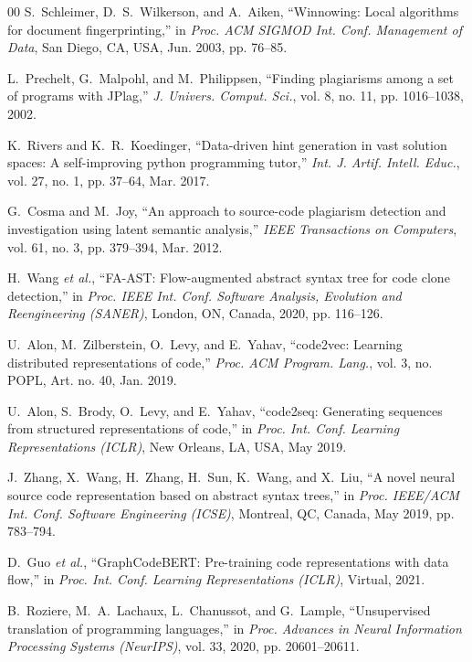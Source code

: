\begin{thebibliography}{00}
S.~Schleimer, D.~S.~Wilkerson, and A.~Aiken, ``Winnowing: Local algorithms for document fingerprinting,'' in \emph{Proc. ACM SIGMOD Int. Conf. Management of Data}, San Diego, CA, USA, Jun. 2003, pp. 76--85.

L.~Prechelt, G.~Malpohl, and M.~Philippsen, ``Finding plagiarisms among a set of programs with JPlag,'' \emph{J. Univers. Comput. Sci.}, vol. 8, no. 11, pp. 1016--1038, 2002.

K.~Rivers and K.~R.~Koedinger, ``Data-driven hint generation in vast solution spaces: A self-improving python programming tutor,'' \emph{Int. J. Artif. Intell. Educ.}, vol. 27, no. 1, pp. 37--64, Mar. 2017.

G.~Cosma and M.~Joy, ``An approach to source-code plagiarism detection and investigation using latent semantic analysis,'' \emph{IEEE Transactions on Computers}, vol. 61, no. 3, pp. 379--394, Mar. 2012.

H.~Wang \emph{et al.}, ``FA-AST: Flow-augmented abstract syntax tree for code clone detection,'' in \emph{Proc. IEEE Int. Conf. Software Analysis, Evolution and Reengineering (SANER)}, London, ON, Canada, 2020, pp. 116--126.

U.~Alon, M.~Zilberstein, O.~Levy, and E.~Yahav, ``code2vec: Learning distributed representations of code,'' \emph{Proc. ACM Program. Lang.}, vol. 3, no. POPL, Art. no. 40, Jan. 2019.

U.~Alon, S.~Brody, O.~Levy, and E.~Yahav, ``code2seq: Generating sequences from structured representations of code,'' in \emph{Proc. Int. Conf. Learning Representations (ICLR)}, New Orleans, LA, USA, May 2019.

J.~Zhang, X.~Wang, H.~Zhang, H.~Sun, K.~Wang, and X.~Liu, ``A novel neural source code representation based on abstract syntax trees,'' in \emph{Proc. IEEE/ACM Int. Conf. Software Engineering (ICSE)}, Montreal, QC, Canada, May 2019, pp. 783--794.

D.~Guo \emph{et al.}, ``GraphCodeBERT: Pre-training code representations with data flow,'' in \emph{Proc. Int. Conf. Learning Representations (ICLR)}, Virtual, 2021.

B.~Roziere, M.~A.~Lachaux, L.~Chanussot, and G.~Lample, ``Unsupervised translation of programming languages,'' in \emph{Proc. Advances in Neural Information Processing Systems (NeurIPS)}, vol. 33, 2020, pp. 20601--20611.


\end{thebibliography}
